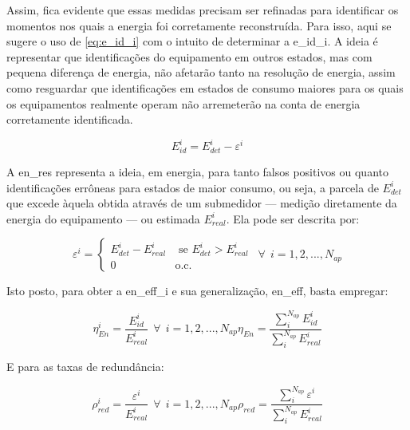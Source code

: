 Assim, fica evidente que essas medidas precisam ser refinadas para
identificar os momentos nos quais a energia foi corretamente
reconstruída. Para isso, aqui se sugere o uso de \ref{eq:e_id_i} com
o intuito de determinar a \gls{e_id_i}. A ideia
é representar que identificações do equipamento em outros estados, mas
com pequena diferença de energia, não afetarão tanto na resolução
de energia, assim como resguardar que identificações em estados de
consumo maiores para os quais os equipamentos realmente operam não
arremeterão na conta de energia corretamente identificada.

\begin{equation}\label{eq:e_id_i}
E_{id}^i = E_{det}^i-\varepsilon^i
\end{equation}

A \gls{en_res} representa a ideia, em energia, para tanto falsos
positivos ou quanto identificações errôneas para estados de maior
consumo, ou seja, a parcela de $E_{det}^i$ que excede àquela obtida
através de um submedidor --- medição diretamente da energia do
equipamento --- ou estimada $E_{real}^i$. Ela pode ser descrita
por:

\begin{equation}\label{eq:en_res}
\varepsilon^i = \left\{\begin{array}{rl}
 E_{det}^i - E_{real}^i &\mbox{ se $E_{det}^i>E_{real}^i$} \\
 0 &\mbox{o.c.}
\end{array} \right. ~~ \forall ~~ i = 1,2,...,N_{ap}
\end{equation}

Isto posto, para obter a \gls{en_eff_i} e sua generalização,
\gls{en_eff}, basta empregar:

\begin{subequations}
\begin{equation}\label{eq:en_eff_i}
\eta_{En}^i = \frac{E_{id}^i}{E_{real}^i} ~~ \forall ~~ i =
1,2,...,N_{ap}
\end{equation}
\begin{equation}\label{eq:en_eff}
\eta_{En} = \frac{\sum_{i}^{N_{ap}}E_{id}^i}{\sum_{i}^{N_{ap}}E_{real}^i}
\end{equation}
\end{subequations}

E para as taxas de redundância:

\begin{subequations}
\begin{equation}\label{eq:p_red_i}
\rho_{red}^i = \frac{\varepsilon^i}{E_{real}^i} ~~ \forall ~~ i =
1,2,...,N_{ap}
\end{equation}
\begin{equation}\label{eq:p_red}
\rho_{red} = \frac{\sum_{i}^{N_{ap}}\varepsilon^i}{\sum_{i}^{N_{ap}}E_{real}^i}
\end{equation}
\end{subequations}

